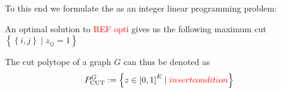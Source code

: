 \documentclass[12pt,a4paper]{article}
\theoremstyle{mythm}
\newtheorem{lem}[thm]{Lemma}
\begin{document}
To this end we formulate the \MCP as an integer linear programming problem:

An optimal solution to \textcolor{red}{REF opti} gives us the following maximum cut $ \left\{ \left\{ i,j \right\}  \mid z _{ ij } = 1 \right\}  $

The cut polytope of a graph $ G $ can thus be denoted as 
\begin{align*}
P ^{ G } _{ \text{CUT}  } := \left\{ z \in \left[ 0,1 \right] ^{ E }   \mid  \textcolor{red}{insert condition}\right\} 
\end{align*} 
%
\end{document}

